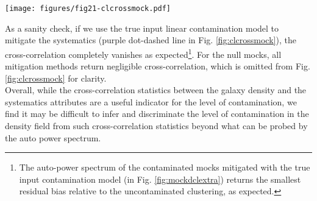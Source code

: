 \begin{figure*}
\centering
\texttt{[image: figures/fig21-clcrossmock.pdf]}
\caption{The mean cross power spectrum of the contaminated mock catalogs and the imaging attributes for different mitigation techniques. Our default neural network method with feature selection is shown in solid red while the performance without feature selection (`Neural Network (Plain)') is shown in dashed blue. The dark grey shaded region shows the 1$\sigma$ confidence region of the plotted quantity derived from $2\sigma(C_{g,s})*C_{g,s}/C_{s,s}$, and the light grey region shows the typical 1-$\sigma$ confidence region of the mean auto power spectrum of the 100 mocks. The mitigation with the ground truth contamination model is shown with a purple dot-dashed curve as `cont. with linear (truth)'. \label{fig:clcrossmock}}
\end{figure*}

As a sanity check, if we use the true input linear contamination model to mitigate the systematics (purple dot-dashed line in Fig. \ref{fig:clcrossmock}), the cross-correlation completely vanishes as expected\footnote{The auto-power spectrum of the contaminated mocks mitigated with the true input contamination model (in Fig. \ref{fig:mockdclextra}) returns the smallest residual bias relative to the uncontaminated clustering, as expected.}. For the null mocks, all mitigation methods return negligible cross-correlation, which is omitted from Fig. \ref{fig:clcrossmock} for clarity.\\

Overall, while the cross-correlation statistics between the galaxy density and the systematics attributes are a useful indicator for the level of contamination, we find it may be difficult to infer and discriminate the level of contamination in the density field from such cross-correlation statistics beyond what can be probed by the auto power spectrum.

